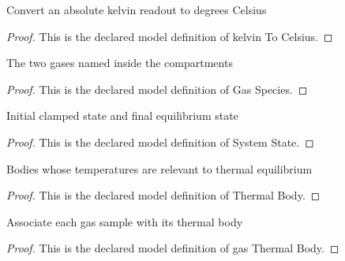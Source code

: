 \begin{definition}
  \label{def:physics:phyx-mini-0359:phyxminiproblems-problemphyxmini0359-kelvintocelsius}
  Convert an absolute kelvin readout to degrees Celsius
\end{definition}
\begin{proof}
  This is the declared model definition of kelvin To Celsius.
\end{proof}
\begin{definition}
  \label{def:physics:phyx-mini-0359:phyxminiproblems-problemphyxmini0359-gasspecies}
  The two gases named inside the compartments
\end{definition}
\begin{proof}
  This is the declared model definition of Gas Species.
\end{proof}
\begin{definition}
  \label{def:physics:phyx-mini-0359:phyxminiproblems-problemphyxmini0359-systemstate}
  Initial clamped state and final equilibrium state
\end{definition}
\begin{proof}
  This is the declared model definition of System State.
\end{proof}
\begin{definition}
  \label{def:physics:phyx-mini-0359:phyxminiproblems-problemphyxmini0359-thermalbody}
  Bodies whose temperatures are relevant to thermal equilibrium
\end{definition}
\begin{proof}
  This is the declared model definition of Thermal Body.
\end{proof}
\begin{definition}
  \label{def:physics:phyx-mini-0359:phyxminiproblems-problemphyxmini0359-gasthermalbody}
  Associate each gas sample with its thermal body
\end{definition}
\begin{proof}
  This is the declared model definition of gas Thermal Body.
\end{proof}
